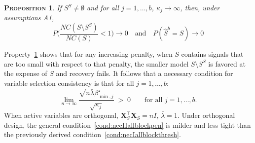 \documentclass[aos]{imsart}
\theoremstyle{plain}
\newtheorem{prop}{\textsc{Proposition}}[section]
\newcommand{\paul}[1]{{\small{\color{green} \sf $\spadesuit$ Paul: #1}}}
\newcommand{\bs}{\boldsymbol}
\begin{document}



\begin{prop}\label{prop:nectypeIIreg}
    If $S^S\neq\emptyset$ and for all $j=1,\ldots,b$, $\kappa_j\to \infty$, then, under assumptions A1,
    $$P\Big(\frac{NC(S\setminus S^S)}{NC(S)}<1\Big) \to 0 \quad\text{and}\quad P(\hat{S}^b=S)\to 0$$
\end{prop}
Property~\ref{prop:nectypeIIreg} shows that for any increasing penalty, when $S$ contains signals that are too small with respect to that penalty, the smaller model $S\setminus S^S$ is favored at the expense of $S$ and recovery fails. It follows that a necessary condition for variable selection consistency is that for all $j=1,\ldots,b$:
\begin{equation}\label{cond:necIIallblockpen}
\lim_{n\to\infty}\frac{\sqrt{n\bar{\lambda}}\beta_{\min,j}^{\star}}{\sqrt{\kappa_j}}\;>\;0\qquad\mbox{for all }j=1,\ldots,b.
\end{equation}
When active variables are orthogonal, $\bs X_S^{\top}\bs X_S = nI$, $\bar{\lambda}=1$. Under orthogonal design, the general condition~\eqref{cond:necIIallblockpen} is milder and less tight than the previously derived condition~\eqref{cond:necIallblockthresh}.
\end{document}
